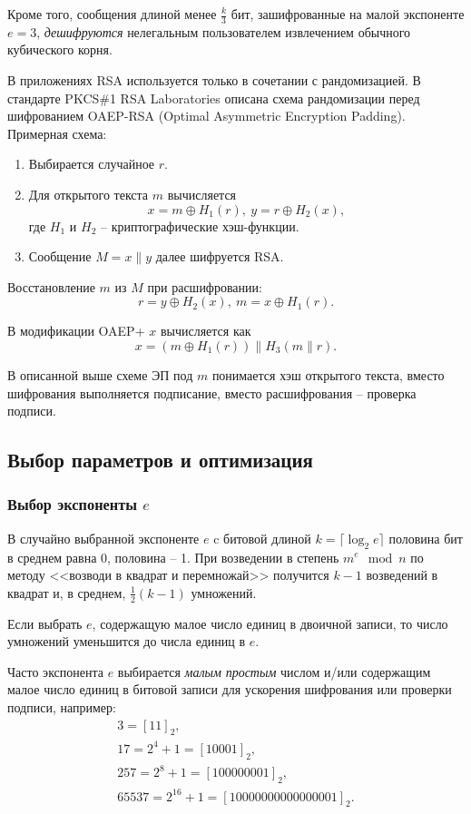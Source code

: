 Кроме того, сообщения длиной менее $\frac{k}{3}$ бит, зашифрованные на малой экспоненте $e=3$, \emph{дешифруются} нелегальным пользователем извлечением обычного кубического корня.

В приложениях RSA используется только в сочетании с рандомизацией. В стандарте PKCS\#1 RSA Laboratories описана схема рандомизации перед шифрованием OAEP-RSA (Optimal Asymmetric Encryption Padding). Примерная схема:
\begin{enumerate}
    \item Выбирается случайное $r$.
    \item Для открытого текста $m$ вычисляется
        \[ x = m \oplus H_1(r), ~ y = r \oplus H_2(x), \]
        где $H_1$ и $H_2$ -- криптографические хэш-функции.
    \item Сообщение $M = x \| y$ далее шифруется RSA.
\end{enumerate}
Восстановление $m$ из $M$ при расшифровании:
    \[ r = y \oplus H_2(x), ~ m = x \oplus H_1(r). \]

В модификации OAEP+ $x$ вычисляется как
    \[ x = (m \oplus H_1(r)) \| H_3(m \| r). \]

В описанной выше схеме ЭП под $m$ понимается хэш открытого текста, вместо шифрования выполняется подписание, вместо расшифрования -- проверка подписи.


\subsection{Выбор параметров и оптимизация}

\subsubsection{Выбор экспоненты $e$}

В случайно выбранной экспоненте $e$ c битовой длиной $k = \lceil \log_2 e \rceil$ половина бит в среднем равна 0, половина -- 1. При возведении в степень $m^e \mod n$ по методу <<возводи в квадрат и перемножай>> получится $k-1$ возведений в квадрат и, в среднем,
 $\frac{1}{2}(k-1)$ умножений.

Если выбрать $e$, содержащую малое число единиц в двоичной записи, то число умножений уменьшится до числа единиц в $e$.

Часто экспонента $e$ выбирается  \emph{малым} \emph{простым} числом и/или содержащим малое число единиц в битовой записи для ускорения шифрования или проверки подписи, например:
\[
    \begin{array}{l}
        3 = [11]_2, \\
        17 = 2^4+1 = [10001]_2, \\
        257 = 2^8+1 = [100000001]_2, \\
        65537 = 2^{16}+1 = [10000000000000001]_2.
    \end{array}
\]

